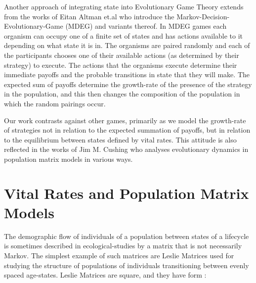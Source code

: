 Another approach of integrating state into Evolutionary Game Theory extends from the works of Eitan Altman et.al \cite{markov2,markov3,markov4,markov5,markov8,markov9} who introduce the Markov-Decision-Evolutionary-Game (MDEG) and variants thereof.
In MDEG games each organism can occupy one of a finite set of states and has actions available to it depending on what state it is in.
The organisms are paired randomly and each of the participants chooses one of their available actions (as determined by their strategy) to execute.
The actions that the organisms execute determine their immediate payoffs and the probable transitions in state that they will make.
The expected sum of payoffs determine the growth-rate of the presence of the strategy in the population, and this then changes the composition of the population in which the random pairings occur.

Our work contrasts against other games, primarily as we model the growth-rate of strategies not in relation to the expected summation of payoffs, but in relation to the equilibrium between states defined by vital rates. This attitude is also reflected in the works of Jim M. Cushing \cite{doi:10.1080/10236198.2016.1177522, Cushing2017,doi:10.1080/17513758.2019.1574034} who analyses evolutionary dynamics in population matrix models in various ways.

\section{Vital Rates and Population Matrix Models}\label{sec:2}

The demographic flow of individuals of a population between states of a lifecycle is sometimes described in ecological-studies by a matrix that is not necessarily Markov.
The simplest example of such matrices are Leslie Matrices used for studying the structure of populations of individuals transitioning between evenly spaced age-states.
Leslie Matrices are square, and they have form \cite{leslie}:

